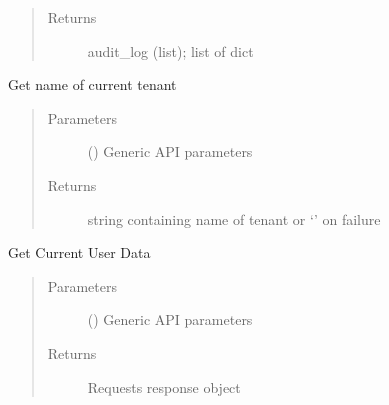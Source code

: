 \documentclass[letterpaper,10pt,english]{sphinxmanual}
\begin{document}
\begin{fulllineitems}
\begin{fulllineitems}
\begin{quote}
\begin{description}
\item[{Returns}] \leavevmode
\sphinxAtStartPar
audit\_log (list); list of dict

\end{description}\end{quote}

\end{fulllineitems}


\begin{fulllineitems}
\label{\detokenize{b1platform-class:bloxone.b1platform.get_current_tenant}}
\sphinxAtStartPar
Get name of current tenant
\begin{quote}\begin{description}
\item[{Parameters}] \leavevmode
\sphinxAtStartPar
{} () \textendash{} Generic API parameters

\item[{Returns}] \leavevmode
\sphinxAtStartPar
string containing name of tenant or ‘’ on failure

\end{description}\end{quote}

\end{fulllineitems}


\begin{fulllineitems}
\label{\detokenize{b1platform-class:bloxone.b1platform.get_current_user}}
\sphinxAtStartPar
Get Current User Data
\begin{quote}\begin{description}
\item[{Parameters}] \leavevmode
\sphinxAtStartPar
{} () \textendash{} Generic API parameters

\item[{Returns}] \leavevmode
\sphinxAtStartPar
Requests response object


\end{description}
\end{quote}
\end{fulllineitems}
\end{fulllineitems}
\end{document}
